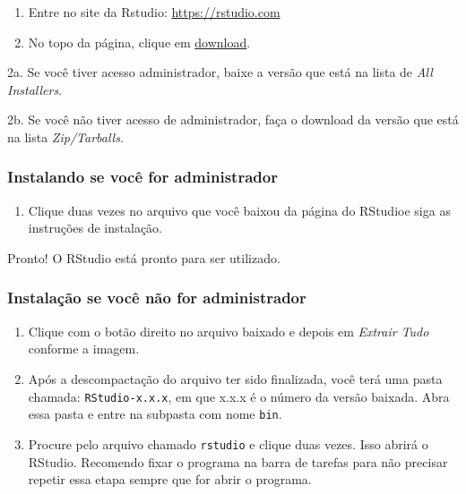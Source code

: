 \documentclass[]{book}
\providecommand{\tightlist}{%
  \setlength{\itemsep}{0pt}\setlength{\parskip}{0pt}}
\begin{document}
\begin{enumerate}
\def\labelenumi{\arabic{enumi}.}
\item
  Entre no site da Rstudio: \url{https://rstudio.com}
\item
  No topo da página, clique em \href{https://rstudio.com/products/rstudio/download/}{download}.
\end{enumerate}

2a. Se você tiver acesso administrador, baixe a versão que está na lista de \emph{All Installers}.

2b. Se você não tiver acesso de administrador, faça o download da versão
que está na lista \emph{Zip/Tarballs}.

\hypertarget{instalando-se-vocuxea-for-administrador}{%
\subsubsection*{Instalando se você for administrador}\label{instalando-se-vocuxea-for-administrador}}

\begin{enumerate}
\def\labelenumi{\arabic{enumi}.}
\setcounter{enumi}{2}
\tightlist
\item
  Clique duas vezes no arquivo que você baixou da página do RStudioe siga as instruções de instalação.
\end{enumerate}

Pronto! O RStudio está pronto para ser utilizado.

\hypertarget{instalauxe7uxe3o-se-vocuxea-nuxe3o-for-administrador}{%
\subsubsection*{Instalação se você não for administrador}\label{instalauxe7uxe3o-se-vocuxea-nuxe3o-for-administrador}}

\begin{enumerate}
\def\labelenumi{\arabic{enumi}.}
\setcounter{enumi}{2}
\item
  Clique com o botão direito no arquivo baixado e depois em \emph{Extrair Tudo} conforme a imagem.
\item
  Após a descompactação do arquivo ter sido finalizada, você terá uma pasta chamada: \texttt{RStudio-x.x.x}, em que x.x.x é o número da versão baixada. Abra essa pasta e entre na subpasta com nome \texttt{bin}.
\item
  Procure pelo arquivo chamado \texttt{rstudio} e clique duas vezes. Isso abrirá o RStudio. Recomendo fixar o programa na barra de tarefas para não precisar repetir essa etapa sempre que for abrir o programa.
\end{enumerate}
\end{document}

